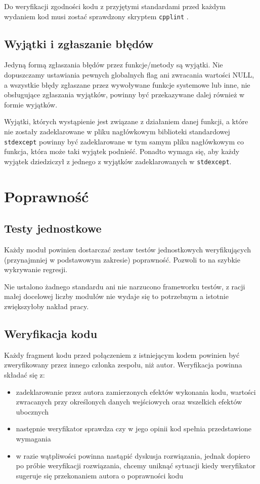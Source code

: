 \documentclass[a4paper]{article}
\begin{document}
Do weryfikacji zgodności kodu z przyjętymi standardami przed każdym wydaniem kod musi zostać sprawdzony skryptem \verb+cpplint+ \cite{cpplint}.

\subsection{Wyjątki i zgłaszanie błędów}

Jedyną formą zgłaszania błędów przez funkcje/metody są wyjątki. Nie dopuszczamy ustawiania pewnych globalnych flag ani zwracania wartości NULL, a wszystkie błędy zgłaszane przez wywoływane funkcje systemowe lub inne, nie obsługujące zgłaszania wyjątków, powinny być przekazywane dalej również w formie wyjątków.

Wyjątki, których wystąpienie jest związane z działaniem danej funkcji, a które nie zostały zadeklarowane w pliku nagłówkowym biblioteki standardowej \verb+stdexcept+ powinny być zadeklarowane w tym samym pliku nagłówkowym co funkcja, która może taki wyjątek podnieść. Ponadto wymaga się, aby każdy wyjątek dziedziczył z jednego z wyjątków zadeklarowanych w \verb+stdexcept+.

\section{Poprawność}

\subsection{Testy jednostkowe}

Każdy moduł powinien dostarczać zestaw testów jednostkowych weryfikujących (przynajmniej w podstawowym zakresie) poprawność. Pozwoli to na szybkie wykrywanie regresji.

Nie ustalono żadnego standardu ani nie narzucono frameworku testów, z racji małej docelowej liczby modułów nie wydaje się to potrzebnym a istotnie zwiększyłoby nakład pracy.

\subsection{Weryfikacja kodu}

Każdy fragment kodu przed połączeniem z istniejącym kodem powinien być zweryfikowany przez innego członka zespołu, niż autor. Weryfikacja powinna składać się z:
\begin{itemize}
\item zadeklarowanie przez autora zamierzonych efektów wykonania kodu, wartości zwracanych przy określonych danych wejściowych oraz wszelkich efektów ubocznych
\item następnie weryfikator sprawdza czy w jego opinii kod spełnia przedstawione wymagania
\item w razie wątpliwości powinna nastąpić dyskusja rozwiązania, jednak dopiero po próbie weryfikacji rozwiązania, chcemy uniknąć sytuacji kiedy weryfikator sugeruje się przekonaniem autora o poprawności kodu
\end{itemize}
\end{document}
